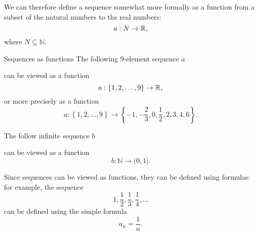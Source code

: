 We can therefore define a sequence somewhat more formally as a function from a subset of the natural numbers to the real numbers:
\begin{equation}
	a:N\to\mathbb{R}^{},
\end{equation}
where $N\subseteq\mathbb{N}$.
\begin{example}{Sequences as functions}{}
	The following $9$-element sequence $a$
	\begin{center}
	\end{center}
	
	can be viewed as a function
	\[
		a:\left\{1,2,\dots,9\right\}\to\mathbb{R}^{},
	\]
	or more precisely as a function
	\[
		a:\left\{1,2,\dots,9\right\}\to\left\{-1,-\frac{2}{3},0,\frac{1}{2},2,3,4,6\right\}.
	\]

	\vspace{2em}
	The follow infinite sequence $b$
	\begin{center}
	\end{center}
	can be viewed as a function
	\[
		b:\mathbb{N}\to(0,1].
	\]
\end{example}

Since sequences can be viewed as functions, they can be defined using formulas: for example, the sequence
\[
	1, \frac{1}{2}, \frac{1}{3}, \frac{1}{4}, \dots
\]
can be defined using the simple formula
\[
	a_{n}=\frac{1}{n}.
\]

